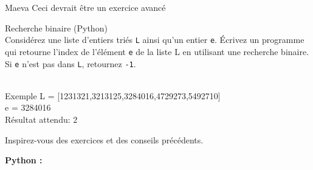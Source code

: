 \begin{note}{Maeva}
    Ceci devrait être un exercice avancé
\end{note}
\begin{Exercice}[10 minutes] Recherche binaire (Python)\\

Considérez une liste d’entiers triés \lstinline{L} ainsi qu’un entier \lstinline{e}. Écrivez un programme qui retourne l'index de l'élément \lstinline{e} de la liste L en utilisant une recherche binaire. Si \lstinline{e} n’est pas dans \lstinline{L}, retournez \lstinline{-1}.\\\\

\begin{Example}{\faTerminal \quad Exemple}
    L = [1231321,3213125,3284016,4729273,5492710] \\

    e = 3284016\\

Résultat attendu: 2
\end{Example}



\begin{conseil}
    Inspirez-vous des exercices et des conseils précédents. 
\end{conseil}

    \begin{solution}
        \textbf{Python :}
        
    \end{solution}

\end{Exercice}

